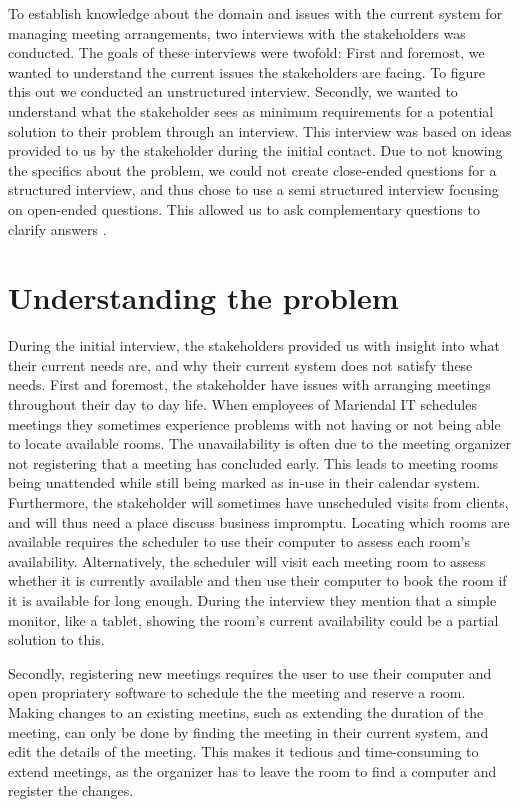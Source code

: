 To establish knowledge about the domain and issues with the current system for managing meeting arrangements, two interviews with the stakeholders was conducted.  
The goals of these interviews were twofold: 
First and foremost, we wanted  to understand the current issues the stakeholders are facing. 
To figure this out we conducted an unstructured interview\cite{robson2002real}.
Secondly, we wanted to understand what the stakeholder sees as minimum requirements for a potential solution to their problem through an interview.
This interview was based on ideas provided to us by the stakeholder during the initial contact.
Due to not knowing the specifics about the problem, we could not create close-ended questions for a structured interview, and thus chose to use a semi structured interview focusing on open-ended questions. This allowed us to ask complementary questions to clarify answers \cite{InterviewsNHS}.


\section{Understanding the problem} %
During the initial interview, the stakeholders provided us with insight into what their current needs are, and why their current system does not satisfy these needs.
First and foremost, the stakeholder have issues with arranging meetings throughout their day to day life.
When employees of Mariendal IT schedules meetings they sometimes experience problems with not having or not being able to locate available rooms.
The unavailability is often due to the meeting organizer not registering that a meeting has concluded early.
This leads to meeting rooms being unattended while still being marked as in-use in their calendar system.
Furthermore, the stakeholder will sometimes have unscheduled visits from clients, and will thus need a place discuss business impromptu. 
Locating which rooms are available requires the scheduler to use their computer to assess each room's availability.
Alternatively, the scheduler will visit each meeting room to assess whether it is currently available and then use their computer to book the room if it is available for long enough.
During the interview they mention that a simple monitor, like a tablet, showing the room's current availability could be a partial solution to this.

Secondly, registering new meetings requires the user to use their computer and open propriatery software to schedule the the meeting and reserve a room.
Making changes to an existing meetins, such as extending the duration of the meeting, can only be done by finding the meeting in their current system, and edit the details of the meeting.
This makes it tedious and time-consuming to extend meetings, as the organizer has to leave the room to find a computer and register the changes.

